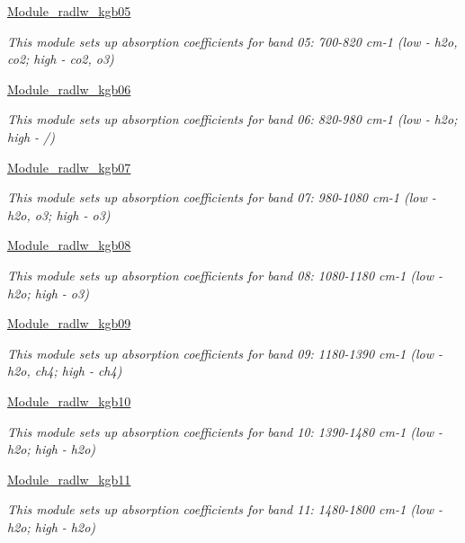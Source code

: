 \begin{DoxyCompactItemize}
\hyperlink{group__module__radlw__kgb05}{Module\+\_\+radlw\+\_\+kgb05}
\begin{DoxyCompactList}\small\item\em This module sets up absorption coefficients for band 05\+: 700-\/820 cm-\/1 (low -\/ h2o, co2; high -\/ co2, o3) \end{DoxyCompactList}\item 
\hyperlink{group__module__radlw__kgb06}{Module\+\_\+radlw\+\_\+kgb06}
\begin{DoxyCompactList}\small\item\em This module sets up absorption coefficients for band 06\+: 820-\/980 cm-\/1 (low -\/ h2o; high -\/ /) \end{DoxyCompactList}\item 
\hyperlink{group__module__radlw__kgb07}{Module\+\_\+radlw\+\_\+kgb07}
\begin{DoxyCompactList}\small\item\em This module sets up absorption coefficients for band 07\+: 980-\/1080 cm-\/1 (low -\/ h2o, o3; high -\/ o3) \end{DoxyCompactList}\item 
\hyperlink{group__module__radlw__kgb08}{Module\+\_\+radlw\+\_\+kgb08}
\begin{DoxyCompactList}\small\item\em This module sets up absorption coefficients for band 08\+: 1080-\/1180 cm-\/1 (low -\/ h2o; high -\/ o3) \end{DoxyCompactList}\item 
\hyperlink{group__module__radlw__kgb09}{Module\+\_\+radlw\+\_\+kgb09}
\begin{DoxyCompactList}\small\item\em This module sets up absorption coefficients for band 09\+: 1180-\/1390 cm-\/1 (low -\/ h2o, ch4; high -\/ ch4) \end{DoxyCompactList}\item 
\hyperlink{group__module__radlw__kgb10}{Module\+\_\+radlw\+\_\+kgb10}
\begin{DoxyCompactList}\small\item\em This module sets up absorption coefficients for band 10\+: 1390-\/1480 cm-\/1 (low -\/ h2o; high -\/ h2o) \end{DoxyCompactList}\item 
\hyperlink{group__module__radlw__kgb11}{Module\+\_\+radlw\+\_\+kgb11}
\begin{DoxyCompactList}\small\item\em This module sets up absorption coefficients for band 11\+: 1480-\/1800 cm-\/1 (low -\/ h2o; high -\/ h2o) \end{DoxyCompactList}\item 

\end{DoxyCompactItemize}
